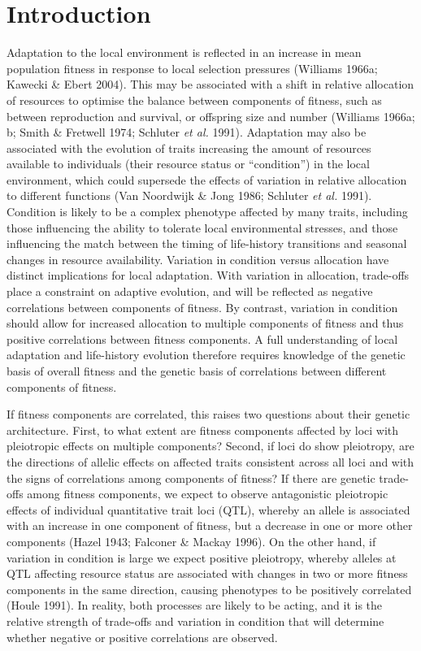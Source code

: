 \documentclass[]{article}
\begin{document}
\hypertarget{introduction}{%
\section{Introduction}\label{introduction}}

Adaptation to the local environment is reflected in an increase in mean population fitness in response to local selection pressures (Williams 1966a; Kawecki \& Ebert 2004). This may be associated with a shift in relative allocation of resources to optimise the balance between components of fitness, such as between reproduction and survival, or offspring size and number (Williams 1966a; b; Smith \& Fretwell 1974; Schluter \emph{et al.} 1991). Adaptation may also be associated with the evolution of traits increasing the amount of resources available to individuals (their resource status or ``condition'') in the local environment, which could supersede the effects of variation in relative allocation to different functions (Van Noordwijk \& Jong 1986; Schluter \emph{et al.} 1991). Condition is likely to be a complex phenotype affected by many traits, including those influencing the ability to tolerate local environmental stresses, and those influencing the match between the timing of life-history transitions and seasonal changes in resource availability. Variation in condition versus allocation have distinct implications for local adaptation. With variation in allocation, trade-offs place a constraint on adaptive evolution, and will be reflected as negative correlations between components of fitness. By contrast, variation in condition should allow for increased allocation to multiple components of fitness and thus positive correlations between fitness components. A full understanding of local adaptation and life-history evolution therefore requires knowledge of the genetic basis of overall fitness and the genetic basis of correlations between different components of fitness.

If fitness components are correlated, this raises two questions about their genetic architecture. First, to what extent are fitness components affected by loci with pleiotropic effects on multiple components? Second, if loci do show pleiotropy, are the directions of allelic effects on affected traits consistent across all loci and with the signs of correlations among components of fitness? If there are genetic trade-offs among fitness components, we expect to observe antagonistic pleiotropic effects of individual quantitative trait loci (QTL), whereby an allele is associated with an increase in one component of fitness, but a decrease in one or more other components (Hazel 1943; Falconer \& Mackay 1996). On the other hand, if variation in condition is large we expect positive pleiotropy, whereby alleles at QTL affecting resource status are associated with changes in two or more fitness components in the same direction, causing phenotypes to be positively correlated (Houle 1991). In reality, both processes are likely to be acting, and it is the relative strength of trade-offs and variation in condition that will determine whether negative or positive correlations are observed.
\end{document}
